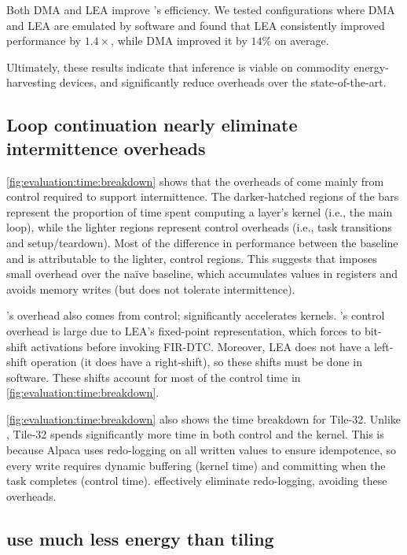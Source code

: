 Both DMA and LEA improve \tails's efficiency. We tested configurations 
where DMA and LEA are emulated by software and found that LEA consistently 
improved performance by $1.4\times$, while DMA improved it by $14\%$ on average.

Ultimately, these results indicate that inference is viable on
commodity energy-harvesting devices, and \sonictails significantly reduce overheads over
the state-of-the-art. 

\subsection{Loop continuation nearly eliminate intermittence overheads}
\autoref{fig:evaluation:time:breakdown} shows that the overheads of \sonictails come mainly
from control required to support intermittence. 
%
The darker-hatched regions of the bars represent the proportion of time spent 
computing a layer's kernel (i.e., the main loop), while the lighter regions represent control overheads (i.e., task transitions and setup/teardown).
%
Most of the difference in performance between the baseline and \sonic is attributable 
to the lighter, control regions. 
%
This suggests that \sonic imposes small overhead
over the na\"ive baseline, which accumulates values in registers and avoids memory writes (but does not tolerate intermittence).

\tails's overhead also comes from control; \tails significantly accelerates kernels.
%
\tails's control overhead is large due to LEA's fixed-point representation,
which forces \tails to bit-shift activations before invoking FIR-DTC.
%
Moreover, LEA does not have a left-shift operation (it does have a right-shift),
so these shifts must be done in software.
%
These shifts account for most of the control time in \autoref{fig:evaluation:time:breakdown}.

\autoref{fig:evaluation:time:breakdown} also shows the time breakdown for Tile-32.
%
Unlike \sonictails,
Tile-32 spends significantly more time in both control and the kernel.
%
This is because Alpaca uses redo-logging on all written values to ensure idempotence,
so every write requires dynamic buffering (kernel time)
and committing when the task completes (control time).
%
\sonictails effectively eliminate redo-logging, avoiding these overheads.

\subsection{\sonictails use much less energy than tiling}

